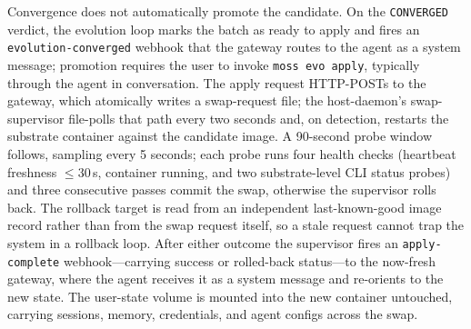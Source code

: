 Convergence does not automatically promote the candidate. On the \texttt{CONVERGED} verdict, the evolution loop marks the batch as ready to apply and fires an \texttt{evolution-converged} webhook that the gateway routes to the agent as a system message; promotion requires the user to invoke \texttt{moss evo apply}, typically through the agent in conversation. The apply request HTTP-POSTs to the gateway, which atomically writes a swap-request file; the host-daemon's swap-supervisor file-polls that path every two seconds and, on detection, restarts the substrate container against the candidate image. A 90-second probe window follows, sampling every 5 seconds; each probe runs four health checks (heartbeat freshness $\leq 30$\,s, container running, and two substrate-level CLI status probes) and three consecutive passes commit the swap, otherwise the supervisor rolls back. The rollback target is read from an independent last-known-good image record rather than from the swap request itself, so a stale request cannot trap the system in a rollback loop. After either outcome the supervisor fires an \texttt{apply-complete} webhook---carrying success or rolled-back status---to the now-fresh gateway, where the agent receives it as a system message and re-orients to the new state. The user-state volume is mounted into the new container untouched, carrying sessions, memory, credentials, and agent configs across the swap.

